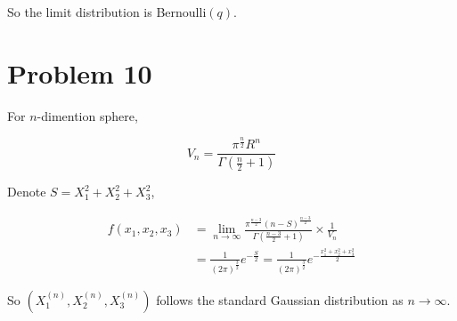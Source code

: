 \documentclass{article}
\begin{document}
So the limit distribution is Bernoulli$(q)$.

\section{Problem 10}

For $n$-dimention sphere,

\begin{equation}
    V_{n}=\frac{\pi^{\frac{n}{2}} R^{n}}{\Gamma\left(\frac{n}{2}+1\right)}
\end{equation}

Denote $S=X_1^2+X_2^2+X_3^2$,

\begin{equation}
    \begin{aligned}
        f(x_1,x_2,x_3) &= \lim_{n \to \infty} \frac{\pi^{\frac{n-3}{2}} (n-S)^{\frac{n-3}{2}}}{\Gamma\left(\frac{n-3}{2}+1\right)} \times \frac{1}{V_n} \\
        & = \frac{1}{(2\pi)^{\frac{3}{2}}} e^{-\frac{S}{2}} = \frac{1}{(2\pi)^{\frac{3}{2}}} e^{-\frac{x_1^2+x_2^2+x_3^2}{2}}
    \end{aligned}
\end{equation}


So $(X_1^{(n)},X_2^{(n)},X_3^{(n)})$ follows the standard Gaussian distribution as $n\to \infty$.










\end{document}
